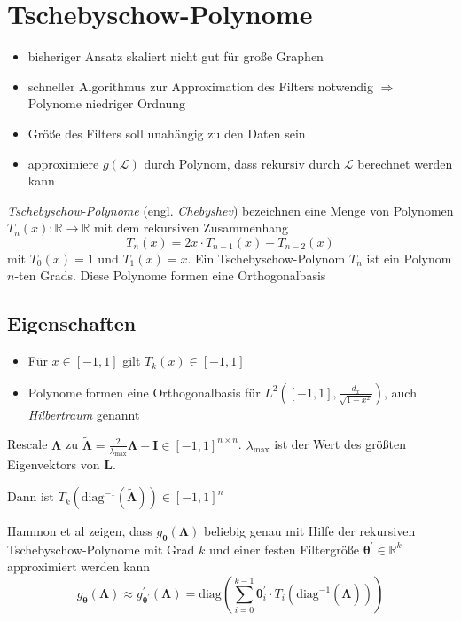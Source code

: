 \section{Tschebyschow-Polynome}

\begin{itemize}
  \item bisheriger Ansatz skaliert nicht gut für große Graphen
  \item schneller Algorithmus zur Approximation des Filters notwendig $\Rightarrow$ Polynome niedriger Ordnung
  \item Größe des Filters soll unahängig zu den Daten sein
  \item approximiere $g(\mathcal{L})$ durch Polynom, dass rekursiv durch $\mathcal{L}$ berechnet werden kann
\end{itemize}

\emph{Tschebyschow-Polynome} (engl. \emph{Chebyshev}) bezeichnen eine Menge von Polynomen $T_n(x) \colon \mathbb{R} \to \mathbb{R}$ mit dem rekursiven Zusammenhang
\begin{equation}
  T_n(x) = 2x \cdot T_{n-1}(x) - T_{n-2}(x)
\end{equation}
mit $T_0(x) = 1$ und $T_1(x) = x$.
Ein Tschebyschow-Polynom $T_n$ ist ein Polynom $n$-ten Grads.
Diese Polynome formen eine Orthogonalbasis

\subsection{Eigenschaften}

\begin{itemize}
  \item Für $x \in [-1, 1]$ gilt $T_k(x) \in [-1, 1]$
  \item Polynome formen eine Orthogonalbasis für $L^2 \left([-1, 1], \frac{d_x}{\sqrt{1-x^2}}\right)$, auch \emph{Hilbertraum} genannt
\end{itemize}

Rescale $\mathbf{\Lambda}$ zu $\mathbf{\tilde \Lambda} = \frac{2}{\lambda_{\max}} \mathbf{\Lambda} - \mathbf{I} \in {\left[-1, 1\right]}^{n \times n}$.
$\lambda_{\max}$ ist der Wert des größten Eigenvektors von $\mathbf{L}$.

Dann ist $T_k\left( \text{diag}^{-1}\left(\mathbf{\tilde \Lambda}\right) \right) \in {\left[-1, 1\right]}^{n}$

Hammon et al zeigen, dass $g_{\mathbf{\theta}}(\mathbf{\Lambda})$ beliebig genau mit Hilfe der  rekursiven Tschebyschow-Polynome mit Grad $k$ und einer festen Filtergröße $\mathbf{\theta}^{\prime} \in \mathbb{R}^k$ approximiert werden kann
\begin{equation}
  g_{\mathbf{\theta}}\left(\mathbf{\Lambda}\right) \approx g^{\prime}_{\mathbf{\theta}^{\prime}}\left(\mathbf{\Lambda}\right) = \text{diag}\left(\sum_{i = 0}^{k-1} \mathbf{\theta}^{\prime}_i \cdot T_i \left(\text{diag}^{-1}\left(\mathbf{\tilde \Lambda}\right)\right)\right)
\end{equation}


